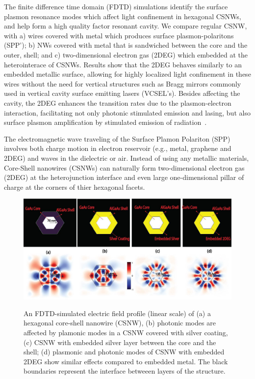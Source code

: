 The finite difference time domain (FDTD) simulations identify the
surface plasmon resonance modes which affect light confinement in hexagonal
CSNWs, and help form a high quality factor resonant cavity. We
compare regular CSNW, with a) wires covered with metal which produces surface
plasmon-polaritons (SPP’); b) NWs covered with metal that is sandwiched between
the core and the outer, shell; and c) two-dimensional electron gas (2DEG)
which embedded at the heterointerace of CSNWs. Results show that the 2DEG
behaves similarly to an embedded metallic surface, allowing for highly
localized light confinement in these wires without the need for vertical
structures such as Bragg mirrors commonly used in vertical cavity surface
emitting lasers (VCSEL’s). Besides affecting the cavity, the 2DEG enhances  the
transition rates due to the plasmon-electron interaction, facilitating not only
photonic stimulated emission and lasing, but also  surface plasmon
amplification by stimulated emission of radiation~\cite{Bergman:2003vo}.

The electromagnetic wave traveling of the Surface Plamon Polariton (SPP)
involves both charge motion in electron reservoir (e.g., metal, graphene and
2DEG) and waves in the dielectric or air. Instead of using any metallic
materials, Core-Shell nanowires (CSNWs) can naturally form two-dimensional
electron gas (2DEG) at the heterojunction interface and even large
one-dimensional pillar of charge at the corners of thier hexagonal facets.


\begin{figure}
  \caption{An FDTD-simulated electric field profile (linear scale) of (a) a hexagonal core-shell nanowire (CSNW), (b) photonic modes are affected by plamonic modes in a CSNW covered with silver coating, (c) CSNW with embedded silver layer between the core and the shell; (d) plasmonic and photonic modes of CSNW with embedded 2DEG show similar effects compared to embedded metal. The black boundaries represent the interface betweeen layers of the structure.}
  \centering
  \includegraphics[width=\textwidth]{pictures/Conclusion/PlasmonMode}
  \label{PlasmonMode}
\end{figure}

